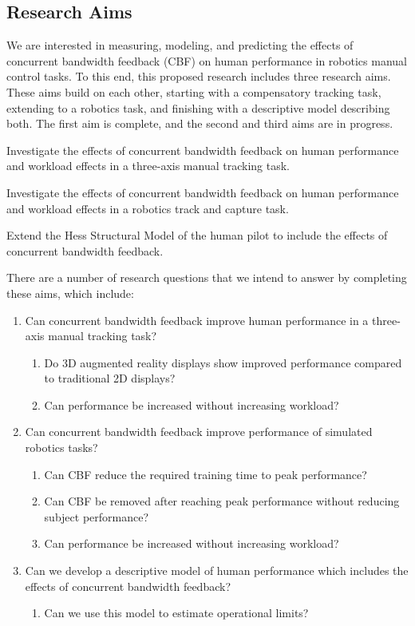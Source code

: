\subsection{Research Aims}
We are interested in measuring, modeling, and predicting the effects of concurrent bandwidth feedback (CBF) on human performance in robotics manual control tasks.
To this end, this proposed research includes three research aims.
These aims build on each other, starting with a compensatory tracking task, extending to a robotics task, and finishing with a descriptive model describing both.
The first aim is complete, and the second and third aims are in progress.
\begin{description}[align=left]
\item [Aim One] Investigate the effects of concurrent bandwidth feedback on human performance and workload effects in a three-axis manual tracking task.
\item [Aim Two] Investigate the effects of concurrent bandwidth feedback on human performance and workload effects in a robotics track and capture task.
\item [Aim Three] Extend the Hess Structural Model of the human pilot to include the effects of concurrent bandwidth feedback.
\end{description}

There are a number of research questions that we intend to answer by completing these aims, which include:
\begin{enumerate}
\item Can concurrent bandwidth feedback improve human performance in a three-axis manual tracking task?
\begin{enumerate}
\item Do 3D augmented reality displays show improved performance compared to traditional 2D displays?
\item Can performance be increased without increasing workload?
\end{enumerate}
\item Can concurrent bandwidth feedback improve performance of simulated robotics tasks?
\begin{enumerate}
\item Can CBF reduce the required training time to peak performance?
\item Can CBF be removed after reaching peak performance without reducing subject performance?
\item Can performance be increased without increasing workload?
\end{enumerate}
\item Can we develop a descriptive model of human performance which includes the effects of concurrent bandwidth feedback?
\begin{enumerate}
\item Can we use this model to estimate operational limits?
\end{enumerate}
\end{enumerate}

